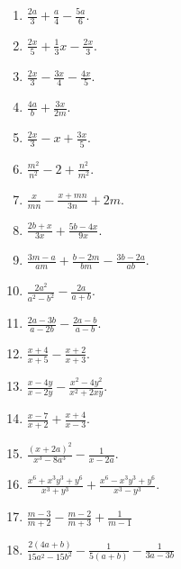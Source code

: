 \documentclass{book}
\begin{document}
\begin{enumerate}
\item $\displaystyle \frac{2a}{3}+\frac{a}{4}-\frac{5a}{6}$.

\item $\displaystyle \frac{2x}{5}+\frac{1}{3} x-\frac{2x}{3}$.

\item $\displaystyle \frac{2x}{3}-\frac{3x}{4}-\frac{4x}{5}$.

\item $\displaystyle \frac{4a}{b}+\frac{3x}{2m}$.

\item $\displaystyle \frac{2x}{3}-x+\frac{3x}{5}$.

\item $\displaystyle \frac{m^2}{n^2}-2+\frac{n^2}{m^2}$.

\item $\displaystyle \frac{x}{mn}-\frac{x+mn}{3n}+2m$.

\item $\displaystyle \frac{2b+x}{3x}+\frac{5b-4x}{9x}$.

\item $\displaystyle
\frac{3m-a}{am}+\frac{b-2m}{bm}-\frac{3b-2a}{ab}$.

\item $\displaystyle \frac{2a^2}{a^2-b^2}-\frac{2a}{a+b}$.

\item $\displaystyle \frac{2a-3b}{a-2b}-\frac{2a-b}{a-b}$.

\item $\displaystyle \frac{x+4}{x+5}-\frac{x+2}{x+3}$.

\item $\displaystyle \frac{x-4y}{x-2y}-\frac{x^2-4y^2}{x^2+2xy}$.

\item $\displaystyle \frac{x-7}{x+2}+\frac{x+4}{x-3}$.

\item $\displaystyle
\frac{\left(x+2a\right)^2}{x^3-8a^3}-\frac{1}{x-2a}$.

\item $\displaystyle
\frac{x^6+x^3y^3+y^6}{x^3+y^3}+\frac{x^6-x^3y^3+y^6}{x^3-y^3}$.

\item $\displaystyle \frac{m - 3}{m + 2} - \frac{m - 2}{m+3} +
\frac{1}{m - 1}$

\item $\displaystyle \frac{2 (4a + b)}{15 a^2 - 15 b^2} -
\frac{1}{5 (a+b)} - \frac{1}{3a - 3b}$


\end{enumerate}
\end{document}
